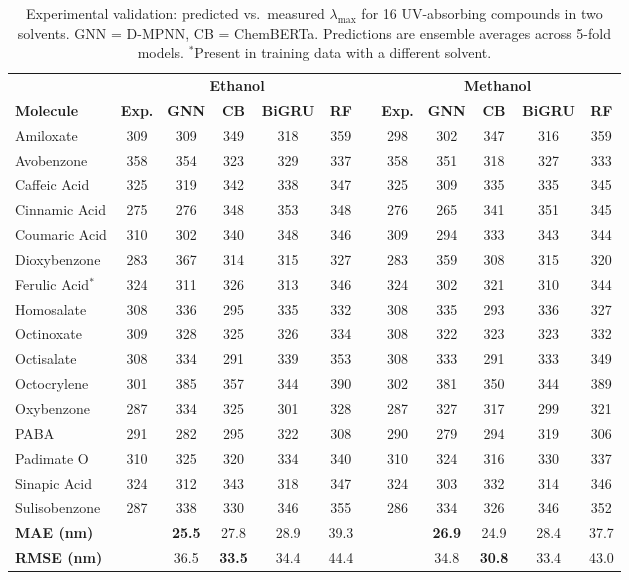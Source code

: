 \begin{table}[!ht]
\centering
\caption{Experimental validation: predicted vs.\ measured $\lambda_{\max}$ for 16 UV-absorbing compounds in two solvents. GNN = D-MPNN, CB = ChemBERTa. Predictions are ensemble averages across 5-fold models. $^*$Present in training data with a different solvent.}
\label{tab:experimental}
\footnotesize
\setlength{\tabcolsep}{3pt}
\begin{tabular}{@{}lccccccccccc@{}}
\toprule
& \multicolumn{5}{c}{\textbf{Ethanol}} & & \multicolumn{5}{c}{\textbf{Methanol}} \\
\cmidrule(lr){2-6} \cmidrule(lr){8-12}
\textbf{Molecule} & \textbf{Exp.} & \textbf{GNN} & \textbf{CB} & \textbf{BiGRU} & \textbf{RF} & & \textbf{Exp.} & \textbf{GNN} & \textbf{CB} & \textbf{BiGRU} & \textbf{RF} \\
\midrule
Amiloxate       & 309 & 309 & 349 & 318 & 359 & & 298 & 302 & 347 & 316 & 359 \\
Avobenzone      & 358 & 354 & 323 & 329 & 337 & & 358 & 351 & 318 & 327 & 333 \\
Caffeic Acid    & 325 & 319 & 342 & 338 & 347 & & 325 & 309 & 335 & 335 & 345 \\
Cinnamic Acid   & 275 & 276 & 348 & 353 & 348 & & 276 & 265 & 341 & 351 & 345 \\
Coumaric Acid   & 310 & 302 & 340 & 348 & 346 & & 309 & 294 & 333 & 343 & 344 \\
Dioxybenzone    & 283 & 367 & 314 & 315 & 327 & & 283 & 359 & 308 & 315 & 320 \\
Ferulic Acid$^*$  & 324 & 311 & 326 & 313 & 346 & & 324 & 302 & 321 & 310 & 344 \\
Homosalate      & 308 & 336 & 295 & 335 & 332 & & 308 & 335 & 293 & 336 & 327 \\
Octinoxate      & 309 & 328 & 325 & 326 & 334 & & 308 & 322 & 323 & 323 & 332 \\
Octisalate      & 308 & 334 & 291 & 339 & 353 & & 308 & 333 & 291 & 333 & 349 \\
Octocrylene     & 301 & 385 & 357 & 344 & 390 & & 302 & 381 & 350 & 344 & 389 \\
Oxybenzone      & 287 & 334 & 325 & 301 & 328 & & 287 & 327 & 317 & 299 & 321 \\
PABA            & 291 & 282 & 295 & 322 & 308 & & 290 & 279 & 294 & 319 & 306 \\
Padimate O      & 310 & 325 & 320 & 334 & 340 & & 310 & 324 & 316 & 330 & 337 \\
Sinapic Acid    & 324 & 312 & 343 & 318 & 347 & & 324 & 303 & 332 & 314 & 346 \\
Sulisobenzone   & 287 & 338 & 330 & 346 & 355 & & 286 & 334 & 326 & 346 & 352 \\
\midrule
\textbf{MAE (nm)} & & \textbf{25.5} & 27.8 & 28.9 & 39.3 & & & \textbf{26.9} & 24.9 & 28.4 & 37.7 \\
\textbf{RMSE (nm)} & & 36.5 & \textbf{33.5} & 34.4 & 44.4 & & & 34.8 & \textbf{30.8} & 33.4 & 43.0 \\
\bottomrule
\end{tabular}
\end{table}


